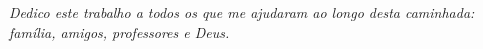 \newpage
\begin{dedicatoria}
  \vspace*{\fill}
  \begin{adjustwidth}{8cm}{0cm}
    \normalsize{
      \textit{Dedico este trabalho a todos os que me ajudaram ao longo desta caminhada: família, amigos, professores e Deus.}
    }
  \end{adjustwidth}
\end{dedicatoria}
